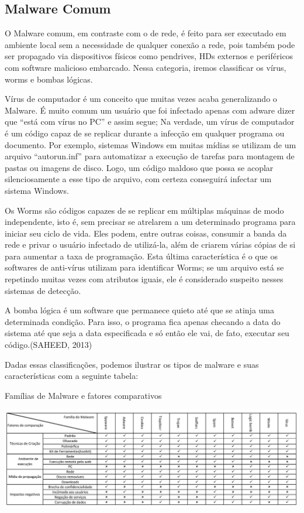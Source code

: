 \subsection{Malware Comum}
\label{ss.malware_comum}

O Malware comum, em contraste com o de rede, é feito para ser executado em
ambiente local sem a necessidade de qualquer conexão a rede, pois também pode
ser propagado via dispositivos físicos como pendrives, HDs externos e
periféricos com software malicioso embarcado. Nessa categoria, iremos
classificar os vírus, worms e bombas lógicas.

Vírus de computador é um conceito que muitas vezes acaba generalizando o
Malware. É muito comum um usuário que foi infectado apenas com adware dizer
que ``está com vírus no PC'' e assim segue; Na verdade, um vírus de computador
é um código capaz de se replicar durante a infecção em qualquer programa ou
documento. Por exemplo, sistemas Windows em muitas mídias se utilizam de um
arquivo ``autorun.inf'' para automatizar a execução de tarefas para montagem
de pastas ou imagens de disco. Logo, um código maldoso que possa se acoplar
silenciosamente a esse tipo de arquivo, com certeza conseguirá infectar um
sistema Windows.

Os Worms são códigos capazes de se replicar em múltiplas máquinas de modo
independente, isto é, sem precisar se atrelarem a um determinado programa para
iniciar seu ciclo de vida. Eles podem, entre outras coisas, consumir a banda
da rede e privar o usuário infectado de utilizá-la, além de criarem várias
cópias de si para aumentar a taxa de programação. Esta última característica é
o que os softwares de anti-vírus utilizam para identificar Worms; se um
arquivo está se repetindo muitas vezes com atributos iguais, ele é considerado
suspeito nesses sistemas de detecção.

A bomba lógica é um software que permanece quieto até que se atinja uma
determinada condição. Para isso, o programa fica apenas checando a data do
sistema até que seja a data especificada e só então ele vai, de fato, executar
seu código.(SAHEED, 2013)

Dadas essas classificações, podemos ilustrar os tipos de malware e suas características com a seguinte tabela:
%
\begin{table}[h]
\caption{\small Famílias de Malware e fatores comparativos}
\centering
\includegraphics{figs/tabela.pdf}
\label{f.tabelamalware}
\end{table}

